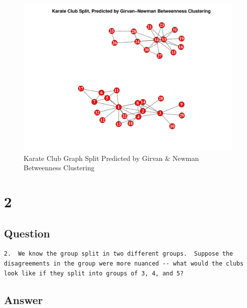 \documentclass[letterpaper,11pt]{article}
\begin{document}
\clearpage
\begin{figure}[h]
\includegraphics[scale=0.5]{club-after.pdf}
\caption{Karate Club Graph Split Predicted by Girvan \& Newman Betweenness Clustering}
\label{fig:club-after}
\end{figure}

\clearpage


\newpage


\section*{2}

\subsection*{Question}

\begin{verbatim}
2.  We know the group split in two different groups.  Suppose the
disagreements in the group were more nuanced -- what would the clubs
look like if they split into groups of 3, 4, and 5?
\end{verbatim}


\subsection*{Answer}
\end{document}
